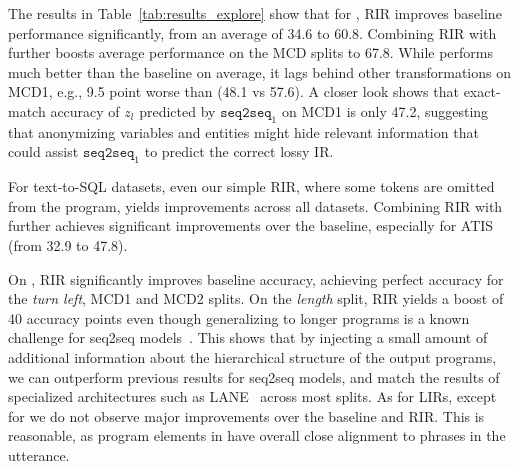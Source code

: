 The results in Table~\ref{tab:results_explore} show that for \cfq{}, RIR improves baseline performance significantly, from an average of 34.6 to 60.8.
Combining RIR with \LIRind{} further boosts average performance on the MCD splits to 67.8. While \LIRdir{} performs much better than the baseline on average, it lags behind other transformations on MCD1, e.g., 9.5 point worse than \LIRind{} (48.1 vs 57.6). A closer look shows that exact-match accuracy of $z_l$ predicted by $\texttt{seq2seq}_1$ on MCD1 is only 47.2, suggesting that anonymizing variables and entities might hide relevant information that could assist $\texttt{seq2seq}_1$ to predict the correct lossy IR.

For text-to-SQL datasets, even our simple RIR, where some tokens are omitted from the program, yields improvements across all datasets. Combining RIR with \LIRdir{} further achieves significant improvements over the baseline, especially for ATIS (from 32.9 to 47.8).

On \scan{}, RIR significantly improves baseline accuracy, achieving perfect accuracy for the \emph{turn left}, MCD1 and MCD2 splits. On the \emph{length} split, RIR yields a boost of 40 accuracy points even though generalizing to longer programs is a known challenge for seq2seq models~\cite{newman-etal-2020-eos}. 
This shows that by injecting a small amount of additional information about the hierarchical structure of the output programs, we can outperform previous results for seq2seq models, and match the results of specialized architectures such as LANE~\cite{liu2020compositional} across most splits.
As for LIRs, except for \LIRdir{} we do not observe major improvements over the baseline and RIR. This is reasonable, as program elements in \scan{} have overall close alignment to phrases in the utterance.

